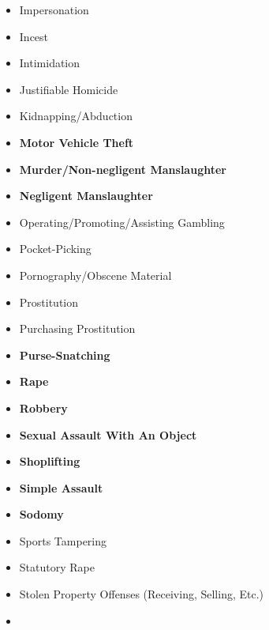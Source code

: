 \documentclass[
  12pt,
  openany]{book}
\begin{document}
\begin{itemize}
\item
  Impersonation\\
\item
  Incest\\
\item
  Intimidation\\
\item
  Justifiable Homicide\\
\item
  Kidnapping/Abduction\\
\item
  \textbf{Motor Vehicle Theft}\\
\item
  \textbf{Murder/Non-negligent Manslaughter}\\
\item
  \textbf{Negligent Manslaughter}\\
\item
  Operating/Promoting/Assisting Gambling\\
\item
  Pocket-Picking\\
\item
  Pornography/Obscene Material\\
\item
  Prostitution\\
\item
  Purchasing Prostitution\\
\item
  \textbf{Purse-Snatching}\\
\item
  \textbf{Rape}\\
\item
  \textbf{Robbery}\\
\item
  \textbf{Sexual Assault With An Object}\\
\item
  \textbf{Shoplifting}\\
\item
  \textbf{Simple Assault}\\
\item
  \textbf{Sodomy}\\
\item
  Sports Tampering\\
\item
  Statutory Rape\\
\item
  Stolen Property Offenses (Receiving, Selling, Etc.)
\item

\end{itemize}
\end{document}
